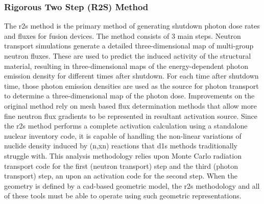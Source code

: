 \documentclass[12pt]{article}
\begin{document}
\subsubsection{Rigorous Two Step (R2S) Method}
The \gls{r2s} method \cite{r2s} is the primary method of generating shutdown
photon dose rates and fluxes for fusion devices. The method consists of 3 main
steps.  Neutron transport simulations generate a detailed three-dimensional
map of multi-group neutron fluxes.  These are used to predict the induced
activity of the structural material, resulting in three-dimensional maps of
the energy-dependent photon emission density for different times after
shutdown.  For each time after shutdown time, those photon emission densities are
used as the source for photon transport to determine a three-dimensional map
of the photon dose.  Improvements on the original method rely on mesh based
flux determination methods \cite{mcr2s,r2smesh,r2suned,pyne_r2s} that allow
more fine neutron flux gradients to be represented in resultant activation
source.  Since the \gls{r2s} method performs a complete activation calculation
using a standalone nuclear inventory code, it is capable of handling the
non-linear variations of nuclide density induced by (n,xn) reactions
that \gls{d1s} methods traditionally struggle with.  This analysis methodology
relies upon Monte Carlo radiation transport code for the first 
(neutron transport) step and the third (photon transport) step, an upon an 
activation code for the second step.  When the geometry is defined by a 
\gls{cad}-based geometric model, the \gls{r2s} methodology and all of these tools
must be able to operate using such geometric representations.
\end{document}
